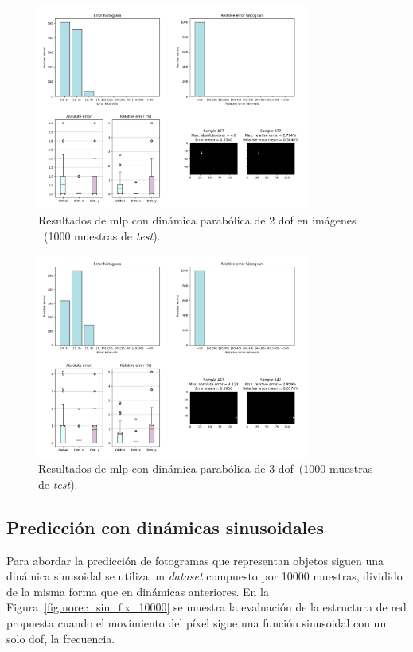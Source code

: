 \begin{figure}[H]
		\begin{center}
			\includegraphics[width=0.8\textwidth]{ figures/test_mod/NOREC/parab_var_10000.png}
			\caption{Resultados de \acrshort{mlp} con dinámica parabólica de 2 \acrshort{dof} en imágenes ~(1000 muestras de \textit{test}).}
			\label{fig.norec_parab_var_10000}
		\end{center}
\end{figure}
\vspace{-30pt}
\begin{figure}[H]
		\begin{center}
			\includegraphics[width=0.8\textwidth]{ figures/test_mod/NOREC/parab_var1_10000.png}
			\caption{Resultados de \acrshort{mlp} con dinámica parabólica de 3 \acrshort{dof}~(1000 muestras de \textit{test}).}
			\label{fig.norec_parab_var1_10000}
		\end{center}
\end{figure}

\subsection{Predicción con dinámicas sinusoidales}
Para abordar la predicción de fotogramas que representan objetos siguen una dinámica sinusoidal se utiliza un \textit{dataset} compuesto por 10000 muestras, dividido de la misma forma que en dinámicas anteriores. En la Figura~\ref{fig.norec_sin_fix_10000} se muestra la evaluación de la estructura de red propuesta cuando el movimiento del píxel sigue una función sinusoidal con un solo \acrshort{dof}, la frecuencia.


